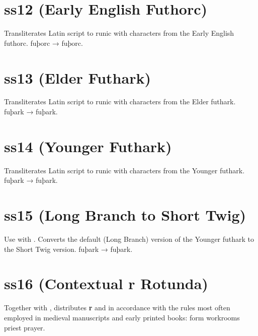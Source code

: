\documentclass[12pt,letterpaper,openany]{book}
\begin{document}
\section{ss12 (Early English Futhorc)}
Transliterates Latin script to runic with characters from the Early English futhorc. fuþorc
→ { fuþorc}.

\section{ss13 (Elder Futhark)}
Transliterates Latin script to runic with characters from the Elder futhark. fuþark
→ { fuþark}.

\section{ss14 (Younger Futhark)}
Transliterates Latin script to runic with characters from the Younger futhark. fuþark
→ { fuþark}.

\section{ss15 (Long Branch to Short Twig)}
Use with . Converts the default (Long Branch) version of the Younger futhark
to the Short Twig version. fuþark
→ { fuþark}.

\section{ss16 (Contextual r Rotunda)}
Together with , distributes \textbf{r} and
\textbf{} in accordance with the rules most often employed in medieval manuscripts and early printed books: { form workrooms priest prayer}.
\end{document}
